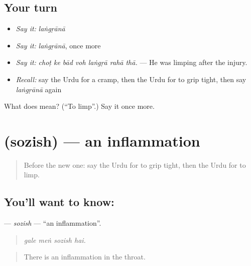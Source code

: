 \subsection*{Your turn}
\begin{itemize}
\raggedright
  \item \emph{Say it:} \emph{laṅgṛānā}
  \item \emph{Say it:} \emph{laṅgṛānā}, once more
  \item \emph{Say it:} \emph{choṭ ke bād voh laṅgṛā rahā thā.} — He was limping after the injury.
  \item \emph{Recall:} say the Urdu for a cramp, then the Urdu for to grip tight, then say \emph{laṅgṛānā} again
\end{itemize}

\begin{tcolorbox}[breakable,colback=teal!4,colframe=teal!35!black,title={Before you move on}]
What does  mean? (\textquotedblleft{}To limp\textquotedblright{}.) Say it once more.
\end{tcolorbox}
\section[\texorpdfstring{\ur{سوزش} (sozish)}{سوزش (sozish)}]{ (sozish) — an inflammation}

\label{lesson:UR-C473-sozish}



\begin{quote}
Before the new one: say the Urdu for to grip tight, then the Urdu for to limp.
\end{quote}

\subsection*{You'll want to know: }
\textbf{} — \emph{sozish} — \textquotedblleft{}an inflammation\textquotedblright{}.

\begin{quote}
   
\end{quote}

\begin{quote}
\emph{gale meṅ sozish hai.}
\end{quote}

\begin{quote}
There is an inflammation in the throat.
\end{quote}

